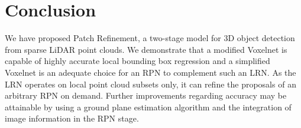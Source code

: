 \documentclass{article}
\begin{document}
\section{Conclusion}
We have proposed Patch Refinement, a two-stage model for 3D object detection from sparse LiDAR point clouds. 
We demonstrate that a modified Voxelnet is capable of highly accurate local bounding box regression and a simplified Voxelnet is an adequate choice for an RPN to complement such an LRN. As the LRN operates on local point cloud subsets only, it can refine the proposals of an arbitrary RPN on demand.
Further improvements regarding accuracy may be attainable by using a ground plane estimation algorithm and the integration of image information in the RPN stage.
{\small


}
\end{document}
